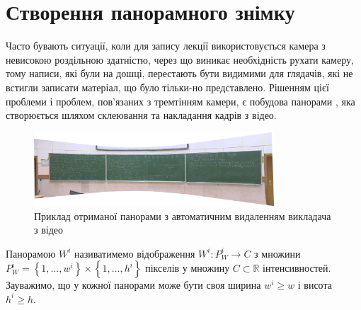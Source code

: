 \section{Створення панорамного знімку}


Часто бувають ситуації, коли для запису лекції використовується камера з
невисокою роздільною здатністю, через що виникає необхідність рухати
камеру, тому написи, які були на дошці, перестають бути видимими для
глядачів, які не встигли записати матеріал, що було тільки-но
представлено. Рішенням цієї проблеми і проблем, пов'язаних з тремтінням
камери, є побудова панорами , яка створюється шляхом склеювання
та накладання кадрів з відео.

\begin{figure}[H]
    \centering
    \includegraphics[width=0.8\textwidth]{images/panorama_example}
    \caption{Приклад отриманої панорами з автоматичним видаленням
    викладача з відео \cite{fpmi_2021_video}
    \label{fig:panorama_example}
    }
\end{figure}

Панорамою \(W^{i}\) називатимемо відображення
\(W^{i}:P_{W}^{i} \rightarrow C\) з множини
\(P_{W}^{i} = \left\{ 1,\ldots,w^{i} \right\} \times \left\{ 1,\ldots,h^{i} \right\}\)
пікселів у множину \(C\mathbb{\subset R}\) інтенсивностей. Зауважимо, що
у кожної панорами може бути своя ширина \(w^{i} \geq w\) і висота
\(h^{i} \geq h\).




